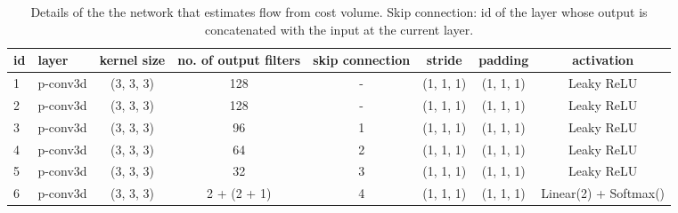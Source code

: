 \documentclass[preprint]{vgtc}
\begin{document}
    \begin{table*}
        \centering
        \begin{tabular}{l|lcccccc}
            \hline
            \textbf{id} & \textbf{layer} & \textbf{kernel size} & \textbf{no. of output filters} & \textbf{skip connection} & \textbf{stride} & \textbf{padding} & \textbf{activation} \\
            \hline
            1 & p-conv3d & (3, 3, 3) & 128 & - & (1, 1, 1) & (1, 1, 1) & Leaky ReLU \\
            2 & p-conv3d & (3, 3, 3) & 128 & - & (1, 1, 1) & (1, 1, 1) & Leaky ReLU \\
            3 & p-conv3d & (3, 3, 3) & 96 & 1 & (1, 1, 1) & (1, 1, 1) & Leaky ReLU \\
            4 & p-conv3d & (3, 3, 3) & 64 & 2 & (1, 1, 1) & (1, 1, 1) & Leaky ReLU \\
            5 & p-conv3d & (3, 3, 3) & 32 & 3 & (1, 1, 1) & (1, 1, 1) & Leaky ReLU \\
            6 & p-conv3d & (3, 3, 3) & 2 + (2  + 1) & 4 & (1, 1, 1) & (1, 1, 1) & Linear(2) + Softmax() \\
            \hline
        \end{tabular}
        \caption{Details of the the network that estimates flow from cost volume. Skip connection: id of the layer whose output is concatenated with the input at the current layer.}
        \label{tab:pwc-flow-estimation}
    \end{table*}
\end{document}

